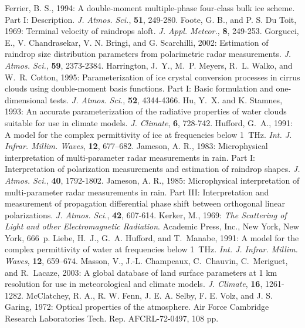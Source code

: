\decrefname
Ferrier, B. S., 1994:
      A double-moment multiple-phase four-class bulk ice scheme.
      Part I: Description.
      {\it J. Atmos. Sci.},
      {\bf 51},
      249-280.
\decrefname
Foote, G. B., and P. S. Du Toit, 1969:
      Terminal velocity of raindrops aloft.
      {\it J. Appl. Meteor.},
      {\bf 8},
      249-253.
\decrefname
Gorgucci, E., V. Chandrasekar, V. N. Bringi, and G. Scarchilli, 2002:
      Estimation of raindrop size distribution parameters from polarimetric
      radar measurements.
      {\it J. Atmos. Sci.},
      {\bf 59},
      2373-2384.
\decrefname
Harrington, J.~Y., M.~P. Meyers, R.~L. Walko, and W.~R. Cotton, 1995:
  Parameterization of ice crystal conversion processes in cirrus clouds using
  double-moment basis functions. Part I: Basic formulation and one-dimensional
  tests. {\it J. Atmos. Sci.}, {\bf 52}, 4344-4366.
\decrefname
Hu, Y.~X. and K. Stamnes, 1993:
   An accurate parameterization of the radiative properties of water clouds
   suitable for use in climate models. {\it J. Climate}, {\bf 6}, 728-742.
\decrefname
Hufford, G.~A., 1991: A model for the complex permittivity of ice at
  frequencies below 1~{THz}. {\em Int. J. Infrar. Millim. Waves}, {\bf 12},
  677--682.
\decrefname
Jameson, A. R., 1983:
      Microphysical interpretation of multi-parameter radar measurements in
      rain. Part I: Interpretation of polarization measurements and estimation
      of raindrop shapes.
      {\it J. Atmos. Sci.},
      {\bf 40},
      1792-1802.
\decrefname
Jameson, A. R., 1985:
      Microphysical interpretation of multi-parameter radar measurements in
      rain. Part III: Interpretation and measurement of propagation 
      differential phase shift between orthogonal linear polarizations.
      {\it J. Atmos. Sci.},
      {\bf 42},
      607-614.
\decrefname
Kerker, M., 1969: {\em The Scattering of Light and other Electromagnetic
  Radiation}. Academic Press, Inc., New York, New York, 666~p.
\decrefname
Liebe, H.~J., G.~A. Hufford, and T.~Manabe, 1991: A model for the complex
  permittivity of water at frequencies below 1~{THz}. {\em Int. J. Infrar.
  Millim. Waves}, {\bf 12}, 659--674.
\decrefname
Masson, V., J.-L. Champeaux, C.~Chauvin, C.~Meriguet, and R.~Lacaze, 2003:
  A global database of land surface parameters at 1 km resolution for use in
  meteorological and climate models. {\it J. Climate}, {\bf 16}, 1261-1282.
\decrefname
McClatchey, R. A., R. W. Fenn, J. E. A. Selby, F. E. Volz, and J. S.
  Garing, 1972: Optical properties of the atmosphere. Air Force
  Cambridge Research Laboratories Tech. Rep. AFCRL-72-0497, 108 pp.
